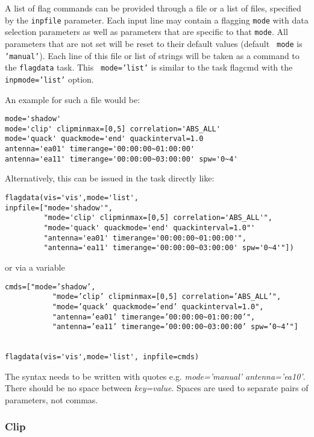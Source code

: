 A list of ﬂag commands can be provided through a ﬁle or a list of
files, speciﬁed by the {\tt inpfile} parameter.  Each input line may
contain a flagging {\tt mode} with data selection parameters as well
as parameters that are specific to that {\tt mode}. All parameters
that are not set will be reset to their default values (default {\tt
  mode} is {\tt 'manual'}). Each line of this file or list of strings
will be taken as a command to the {\tt flagdata} task. This {\tt
  mode=’list’} is similar to the task flagcmd with the {\tt
  inpmode=’list’} option.

An example for such a file would be: 

\small
\begin{verbatim}
mode='shadow'
mode='clip' clipminmax=[0,5] correlation='ABS_ALL'
mode='quack' quackmode='end' quackinterval=1.0
antenna='ea01' timerange='00:00:00~01:00:00'
antenna='ea11' timerange='00:00:00~03:00:00' spw='0~4'
\end{verbatim}
\normalsize

Alternatively, this can be issued in the task directly like:

\small
\begin{verbatim}
flagdata(vis='vis',mode='list',
inpfile=["mode='shadow'",
         "mode='clip' clipminmax=[0,5] correlation='ABS_ALL'",
         "mode='quack' quackmode='end' quackinterval=1.0"'
         "antenna='ea01' timerange='00:00:00~01:00:00'",
         "antenna='ea11' timerange='00:00:00~03:00:00' spw='0~4'"])
\end{verbatim}
\normalsize
or via a variable
\small
\begin{verbatim}
cmds=["mode=’shadow’,
           "mode=’clip’ clipminmax=[0,5] correlation=’ABS_ALL’",
           "mode=’quack’ quackmode=’end’ quackinterval=1.0",
           "antenna=’ea01’ timerange=’00:00:00~01:00:00’",
           "antenna=’ea11’ timerange=’00:00:00~03:00:00’ spw=’0~4’"]


flagdata(vis='vis',mode='list', inpfile=cmds)
\end{verbatim}
\normalsize



The syntax needs to be written with quotes e.g. {\it mode=’manual’ antenna=’ea10’}. There should be no
space between {\it key=value}. Spaces are used to separate pairs of
parameters, not commas.



\subsubsection{Clip}
\label{section:edit.flagdata.mode.clip}

